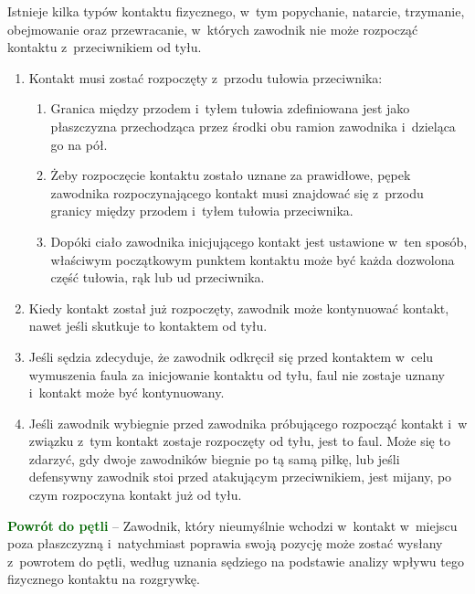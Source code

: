 \documentclass[12pt,a4paper]{article}
\renewcommand{\paragraph}[1]{
  \oldparagraph{#1}%
  \leftskip2.8cm
}
\newcommand\other[1]{\bgroup\textcolor{darkgreen}{\textbf{#1}}}
\begin{document}
\paragraph{Miejsce rozpoczęcia kontaktu}
Istnieje kilka typów
kontaktu fizycznego, w~tym popychanie, natarcie, trzymanie, obejmowanie
oraz przewracanie, w~których zawodnik nie może rozpocząć kontaktu z~przeciwnikiem od tyłu.

\begin{enumerate}
	\item
	      Kontakt musi zostać rozpoczęty z~przodu tułowia przeciwnika:

	      \begin{enumerate}
		      \item
		            Granica między przodem i~tyłem tułowia zdefiniowana jest jako
		            płaszczyzna przechodząca przez środki obu ramion zawodnika i~dzieląca go na pół.
		      \item
		            Żeby rozpoczęcie kontaktu zostało uznane za prawidłowe, pępek
		            zawodnika rozpoczynającego kontakt musi znajdować się z~przodu
		            granicy między przodem i~tyłem tułowia przeciwnika.
		      \item
		            Dopóki ciało zawodnika inicjującego kontakt jest ustawione w~ten
		            sposób, właściwym początkowym punktem kontaktu może być każda
		            dozwolona część tułowia, rąk lub ud przeciwnika.
	      \end{enumerate}
	\item
	      Kiedy kontakt został już rozpoczęty, zawodnik może kontynuować
	      kontakt, nawet jeśli skutkuje to kontaktem od tyłu.
	\item
	      Jeśli sędzia zdecyduje, że zawodnik odkręcił się przed kontaktem w~celu wymuszenia faula za inicjowanie kontaktu od tyłu, faul nie
	      zostaje uznany i~kontakt może być kontynuowany.
	\item
	      Jeśli zawodnik wybiegnie przed zawodnika próbującego rozpocząć kontakt
	      i~w związku z~tym kontakt zostaje rozpoczęty od tyłu, jest to faul.
	      Może się to zdarzyć, gdy dwoje zawodników biegnie po tą samą piłkę,
	      lub jeśli defensywny zawodnik stoi przed atakującym przeciwnikiem,
	      jest mijany, po czym rozpoczyna kontakt już od tyłu.
\end{enumerate}

\other{Powrót do pętli} -- Zawodnik, który nieumyślnie wchodzi w~kontakt w~miejscu poza płaszczyzną i~natychmiast poprawia swoją pozycję może
zostać wysłany z~powrotem do pętli, według uznania sędziego na podstawie
analizy wpływu tego fizycznego kontaktu na rozgrywkę.
\end{document}
